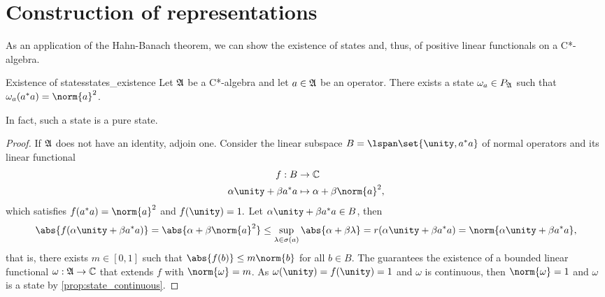 \section{Construction of representations}
As an application of the Hahn-Banach theorem, we can show the existence of states and, thus, of positive linear functionals on a C*-algebra.
\begin{proposition}{Existence of states}{states_existence}
    Let \(\mathfrak{A}\) be a C*-algebra and let \(a \in \mathfrak{A}\) be an operator. There exists a state \(\omega_a \in P_{\mathfrak{A}}\) such that \(\omega_a(a^*a) = \norm{a}^2\).
\end{proposition}
\begin{remark}
    In fact, such a state is a pure state.
\end{remark}
\begin{proof}
    If \(\mathfrak{A}\) does not have an identity, adjoin one. Consider the linear subspace \(B = \lspan\set{\unity, a^*a}\) of normal operators and its linear functional
    \begin{align*}
        f : B &\to \mathbb{C}\\
        \alpha \unity + \beta a^*a &\mapsto \alpha + \beta \norm{a}^2,
    \end{align*}
    which satisfies \(f(a^*a) = \norm{a}^2\) and \(f(\unity) = 1.\) Let \(\alpha \unity + \beta a^*a \in B\), then
    \begin{equation*}
        \abs{f(\alpha \unity + \beta a^*a)} = \abs{\alpha + \beta \norm{a}^2} \leq \sup_{\lambda \in \sigma(a)}{\abs{\alpha + \beta \lambda}} = r(\alpha \unity + \beta a^*a) = \norm{\alpha \unity + \beta a^*a},
    \end{equation*}
    that is, there exists \(m \in [0,1]\) such that \(\abs{f(b)}\leq m \norm{b}\) for all \(b \in B\). The  guarantees the existence of a bounded linear functional \(\omega : \mathfrak{A} \to \mathbb{C}\) that extends \(f\) with \(\norm{\omega} = m\). As \(\omega(\unity) = f(\unity) = 1\) and \(\omega\) is continuous, then \(\norm{\omega} = 1\) and \(\omega\) is a state by \cref{prop:state_continuous}.
\end{proof}

